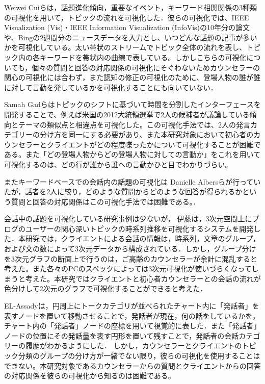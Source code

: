 \documentclass[shuuron]{kuee}
\begin{document}
Weiwei Cuiら\cite{cui2011textflow}は，話題進化傾向，重要なイベント，キーワード相関関係の3種類の可視化を用いて，トピックの流れを可視化した．彼らの可視化では、IEEE Visualization (Vis)・IEEE Information Visualization (InfoVis)の10年分の論文や、Bingの2週間分のニュースデータを入力とし、いつどんな話題の記事が多いかを可視化している。太い帯状のストリームでトピック全体の流れを表し、トピック内の各キーワードを帯状内の曲線で表している。しかしこちらの可視化についても，個々の質問と回答の対応関係の可視化にそぐわないためカウンセラーの関心の可視化には合わず，また認知の修正の可視化のために、登場人物の誰が誰に対して言動を発しているかを可視化することにも向いていない．

Samah Gadら\cite{gad2015themedelta}はトピックのシフトに基づいて時間を分割したインターフェースを開発することで、例えば米国の2012大統領選挙で2人の候補者が議論している傾向とテーマの類似点と相違点を可視化した。この可視化手法では、2人の発言カテゴリーの分け方を同一にする必要があり、また本研究対象において初心者のカウンセラーとクライエントがどの程度喋ったかについて可視化することが困難である。また「どの登場人物からどの登場人物に対しての言動か」をこれを用いて可視化するのは、どの行が誰から誰への言動かひと目でわかりづらい。

またキーワードベースでの会話内の話題の可視化は Danielle Albersら\cite{angus2012conceptual}が行っていたが，話者を2人に絞り，どのような質問からどのような回答が得られるかという質問と回答の対応関係はこの可視化手法では困難である。．%

会話中の話題を可視化している研究事例は少ないが，
伊藤\cite{itoh2010interactive}は，3次元空間上にブログのユーザーの関心深いトピックの時系列推移を可視化するシステムを開発した．本研究では，クライエントによる会話の情報は，時系列，文章のグループ，および文の数によって3次元データから構成されている．しかし，グループ分けを3次元グラフの断面上で行うのは，ご高齢のカウンセラーが余計に混乱すると考えた。また各々のPCのスペックによっては3次元可視化が使いづらくなってしまうと考えた。本研究ではクライエントと初心者カウンセラーとの会話の流れが色分けして2次元のグラフで可視化することができると考えた．%

EL-Assady\cite{el2016contovi}は，円周上にトークカテゴリが並べられたチャート内に「発話者」を表すノードを置いて移動させることで，発話者が現在，何の話をしているかを，チャート内の「発話者」ノードの座標を用いて視覚的に表した．また「発話者」ノードの位置にその発話量を表す円形を置いて残すことで，発話者の会話カテゴリーの履歴がわかるようにした．
しかし，カウンセラーとクライエントのトピック分類のグループの分け方が一緒でない限り，彼らの可視化を使用することはできない。本研究対象であるカウンセラーからの質問とクライエントからの回答の対応関係を彼らの可視化から知るのは困難である。
\end{document}
